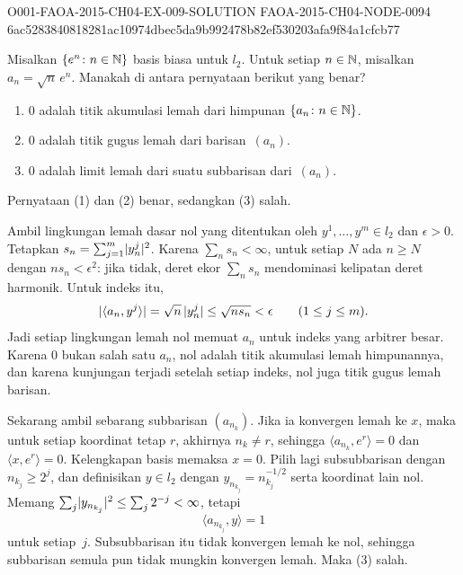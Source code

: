 \begin{o001solution}
  {O001-FAOA-2015-CH04-EX-009-SOLUTION}
  {FAOA-2015-CH04-NODE-0094}
  {6ac5283840818281ac10974dbec5da9b992478b82ef530203afa9f84a1cfcb77}
\begin{o001statement}
Misalkan $\{e^n\colon n \in \mathbb{N}\}$ basis biasa untuk $l_2$. Untuk
setiap $n \in \mathbb{N}$, misalkan $a_n = \sqrt n\, e^n$. Manakah di antara pernyataan berikut
yang benar?
 \begin{enumerate}
  \item $0$ adalah titik akumulasi lemah dari himpunan
$\{a_n\colon n \in \mathbb{N}\}$.
  \item $0$ adalah titik gugus lemah dari barisan~$(a_n)$.
  \item $0$ adalah limit lemah dari suatu subbarisan dari~$(a_n)$.
 \end{enumerate}
\end{o001statement}
\begin{o001answer}
Pernyataan (1) dan (2) benar, sedangkan (3) salah.
\end{o001answer}
\begin{o001proof}
Ambil lingkungan lemah dasar nol yang ditentukan oleh
$y^1,\ldots,y^m\in l_2$ dan $\epsilon>0$. Tetapkan
$s_n=\sum_{j=1}^m\lvert y^j_n\rvert^2$. Karena $\sum_ns_n<\infty$, untuk setiap
$N$ ada $n\geq N$ dengan $ns_n<\epsilon^2$: jika tidak, deret ekor
$\sum_ns_n$ mendominasi kelipatan deret harmonik. Untuk indeks itu,
\[
 \lvert\langle a_n,y^j\rangle\rvert
 =\sqrt n\,\lvert y^j_n\rvert\leq\sqrt{ns_n}<\epsilon
 \qquad(1\leq j\leq m).
\]
Jadi setiap lingkungan lemah nol memuat $a_n$ untuk indeks yang arbitrer
besar. Karena $0$ bukan salah satu $a_n$, nol adalah titik akumulasi lemah
himpunannya, dan karena kunjungan terjadi setelah setiap indeks, nol juga
titik gugus lemah barisan.

Sekarang ambil sebarang subbarisan $(a_{n_k})$. Jika ia konvergen lemah ke
$x$, maka untuk setiap koordinat tetap $r$, akhirnya $n_k\neq r$, sehingga
$\langle a_{n_k},e^r\rangle=0$ dan $\langle x,e^r\rangle=0$. Kelengkapan
basis memaksa $x=0$. Pilih lagi subsubbarisan dengan
$n_{k_j}\geq2^j$, dan definisikan $y\in l_2$ dengan
$y_{n_{k_j}}=n_{k_j}^{-1/2}$ serta koordinat lain nol. Memang
$\sum_j\lvert y_{n_{k_j}}\rvert^2\leq\sum_j2^{-j}<\infty$, tetapi
\[
 \langle a_{n_{k_j}},y\rangle=1
\]
untuk setiap~$j$. Subsubbarisan itu tidak konvergen lemah ke nol, sehingga
subbarisan semula pun tidak mungkin konvergen lemah. Maka (3) salah.
\end{o001proof}
\end{o001solution}

